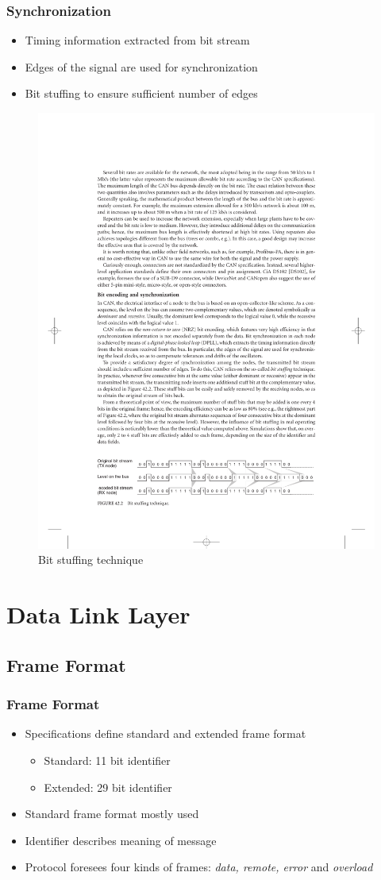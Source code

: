 \documentclass{beamer}
\begin{document}
\begin{frame}
	\frametitle{Synchronization}
	\begin{itemize}
		\item Timing information extracted from bit stream
		\item Edges of the signal are used for synchronization
		\item Bit stuffing to ensure sufficient number of edges
	\end{itemize}
		\begin{figure}
	\includegraphics[width=.6\textwidth]{bitstuffing.pdf} 
\caption{Bit stuffing technique}%
\end{figure}
\end{frame}

\section{Data Link Layer}
\subsection{Frame Format}
\begin{frame}
	\frametitle{Frame Format}
	\begin{itemize}
		\item Specifications define standard and extended frame format
		\begin{itemize}
			\item Standard: 11 bit identifier
			\item Extended: 29 bit identifier
		\end{itemize}
		\item Standard frame format mostly used
		\item Identifier describes meaning of message
		\item Protocol foresees four kinds of frames: \emph{data, remote, error} and \emph{overload}
	\end{itemize}
\end{frame}
\end{document}
